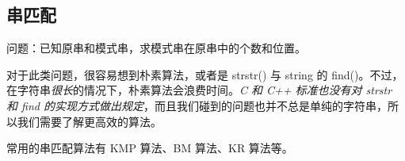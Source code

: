 \subsection{串匹配}
	问题：已知原串和模式串，求模式串在原串中的个数和位置。
	
	对于此类问题，很容易想到朴素算法，或者是 strstr() 与 string 的 find()。不过，在字符串\emph{很长}的情况下，朴素算法会浪费时间。\emph{C 和 C++ 标准也没有对 strstr 和 find 的实现方式做出规定}，而且我们碰到的问题也并不总是单纯的字符串，所以我们需要了解更高效的算法。
	
	常用的串匹配算法有 KMP 算法、BM 算法、KR 算法等。

	
	
